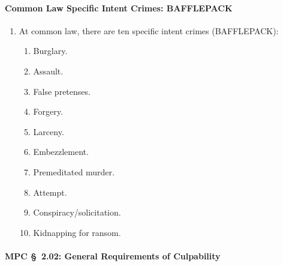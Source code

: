 \paragraph{Common Law Specific Intent Crimes: BAFFLEPACK}

\begin{enumerate}
    \item At common law, there are ten specific intent crimes (BAFFLEPACK):
    \begin{enumerate}
        \item Burglary.
        \item Assault.
        \item False pretenses.
        \item Forgery.
        \item Larceny.
        \item Embezzlement.
        \item Premeditated murder.
        \item Attempt.
        \item Conspiracy/solicitation.
        \item Kidnapping for ransom.
    \end{enumerate}
\end{enumerate}

\paragraph{MPC \S\ 2.02: General Requirements of Culpability}


